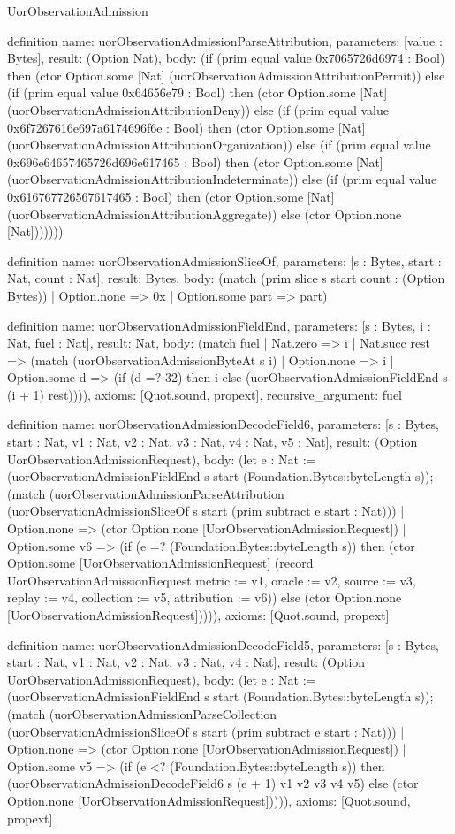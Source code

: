 \begin{lexlean}{UorObservationAdmission}
\begin{semanticmodule}
definition{
  name: uorObservationAdmissionParseAttribution,
  parameters: [value : Bytes],
  result: (Option Nat),
  body: (if (prim equal value 0x7065726d6974 : Bool) then (ctor Option.some [Nat] (uorObservationAdmissionAttributionPermit)) else (if (prim equal value 0x64656e79 : Bool) then (ctor Option.some [Nat] (uorObservationAdmissionAttributionDeny)) else (if (prim equal value 0x6f7267616e697a6174696f6e : Bool) then (ctor Option.some [Nat] (uorObservationAdmissionAttributionOrganization)) else (if (prim equal value 0x696e64657465726d696e617465 : Bool) then (ctor Option.some [Nat] (uorObservationAdmissionAttributionIndeterminate)) else (if (prim equal value 0x616767726567617465 : Bool) then (ctor Option.some [Nat] (uorObservationAdmissionAttributionAggregate)) else (ctor Option.none [Nat]))))))
}

definition{
  name: uorObservationAdmissionSliceOf,
  parameters: [s : Bytes, start : Nat, count : Nat],
  result: Bytes,
  body: (match (prim slice s start count : (Option Bytes))
    | Option.none => 0x
    | Option.some part => part)
}

definition{
  name: uorObservationAdmissionFieldEnd,
  parameters: [s : Bytes, i : Nat, fuel : Nat],
  result: Nat,
  body: (match fuel
    | Nat.zero => i
    | Nat.succ rest => (match (uorObservationAdmissionByteAt s i)
      | Option.none => i
      | Option.some d => (if (d =? 32) then i else (uorObservationAdmissionFieldEnd s (i + 1) rest)))),
  axioms: [Quot.sound, propext],
  recursive_argument: fuel
}

definition{
  name: uorObservationAdmissionDecodeField6,
  parameters: [s : Bytes, start : Nat, v1 : Nat, v2 : Nat, v3 : Nat, v4 : Nat, v5 : Nat],
  result: (Option UorObservationAdmissionRequest),
  body: (let e : Nat := (uorObservationAdmissionFieldEnd s start (Foundation.Bytes::byteLength s)); (match (uorObservationAdmissionParseAttribution (uorObservationAdmissionSliceOf s start (prim subtract e start : Nat)))
    | Option.none => (ctor Option.none [UorObservationAdmissionRequest])
    | Option.some v6 => (if (e =? (Foundation.Bytes::byteLength s)) then (ctor Option.some [UorObservationAdmissionRequest] (record UorObservationAdmissionRequest {metric := v1, oracle := v2, source := v3, replay := v4, collection := v5, attribution := v6})) else (ctor Option.none [UorObservationAdmissionRequest])))),
  axioms: [Quot.sound, propext]
}

definition{
  name: uorObservationAdmissionDecodeField5,
  parameters: [s : Bytes, start : Nat, v1 : Nat, v2 : Nat, v3 : Nat, v4 : Nat],
  result: (Option UorObservationAdmissionRequest),
  body: (let e : Nat := (uorObservationAdmissionFieldEnd s start (Foundation.Bytes::byteLength s)); (match (uorObservationAdmissionParseCollection (uorObservationAdmissionSliceOf s start (prim subtract e start : Nat)))
    | Option.none => (ctor Option.none [UorObservationAdmissionRequest])
    | Option.some v5 => (if (e <? (Foundation.Bytes::byteLength s)) then (uorObservationAdmissionDecodeField6 s (e + 1) v1 v2 v3 v4 v5) else (ctor Option.none [UorObservationAdmissionRequest])))),
  axioms: [Quot.sound, propext]
}


\end{semanticmodule}
\end{lexlean}
